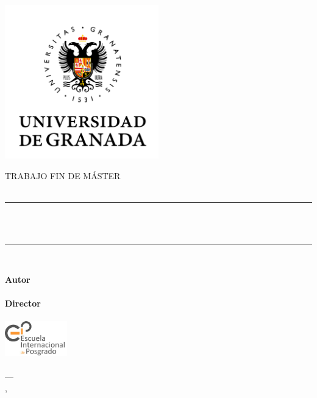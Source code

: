 \documentclass[../main.tex]{memoir}
\begin{document}
\begin{titlingpage}

  \newlength{\centeroffset}
  \setlength{\centeroffset}{-0.5\oddsidemargin}
  \addtolength{\centeroffset}{0.5\evensidemargin}
  \thispagestyle{empty}

  \noindent\hspace*{\centeroffset}
  \begin{minipage}{\textwidth}
    \vspace{-2cm}
    \centering
    \includegraphics[width=0.5\textwidth]{images/logo_ugr.png}

   \textsc{ \Large TRABAJO FIN DE MÁSTER\\[0.2cm]}
    \textsc{ \Degree }\\[0.5cm]
    
    {\Large\bfseries
    	\noindent\rule[-1ex]{\textwidth}{1pt}\\[2ex]
    	\ProjectTitle\\
    }
    \noindent\rule[-1ex]{\textwidth}{3pt}\\[2ex]
  \end{minipage}

  \vspace{1.5cm}
  \noindent\hspace*{\centeroffset}\begin{minipage}{\textwidth}
    \centering

    \textbf{Autor}\\ {\AuthorName}\\[2ex]
    \textbf{Director}\\
    {\MainProf}\\[1cm]
   \includegraphics[height=1.5cm]{images/logo_eip.jpeg}\\[1cm]
   \textsc{\FacultyOne}\\
    \textsc{---}\\
    \Location, \Time
  \end{minipage}

\end{titlingpage}
\end{document}
